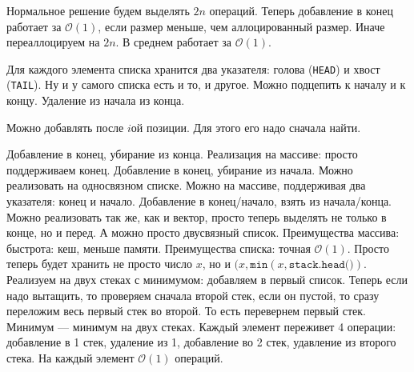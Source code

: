 Нормальное решение будем выделять  $2n$ операций. Теперь добавление в конец работает за  $\mathcal{O}(1)$, если размер меньше, чем аллоцированный размер. Иначе переаллоцируем на $2n$. В среднем работает за  $\mathcal{O}(1)$.

Для каждого элемента списка хранится два указателя: голова (\texttt{HEAD}) и хвост (\texttt{TAIL}). Ну и у самого списка есть и то, и другое.
Можно подцепить к началу и к концу. Удаление из начала из конца.

Можно добавлять после $i$ой позиции. Для этого его надо сначала найти.

Добавление в конец, убирание из конца. Реализация на массиве: просто поддерживаем конец.
Добавление в конец, убирание из начала. Можно реализовать на односвязном списке. Можно на массиве, поддерживая два указателя: конец и начало.
Добавление в конец/начало, взять из начала/конца. 
Можно реализовать так же, как и вектор, просто теперь выделять не только в конце, но и перед. А можно просто двусвязный список.
Преимущества массива: быстрота: кеш, меньше памяти. Преимущества списка: точная $\mathcal{O}(1)$.
Просто теперь будет хранить не просто число $x$, но и  $(x, \texttt{min}(x, \texttt{stack.head()})$.
Реализуем на двух стеках с минимумом: добавляем в первый список. Теперь если надо вытащить, то проверяем сначала второй стек, если он пустой, то сразу переложим весь первый стек во второй. То есть перевернем первый стек. Минимум --- минимум на двух стеках. Каждый элемент переживет 4 операции: добавление в 1 стек, удаление из 1, добавление во 2 стек, удавление из второго стека. На каждый элемент  $\mathcal{O}(1)$ операций.
